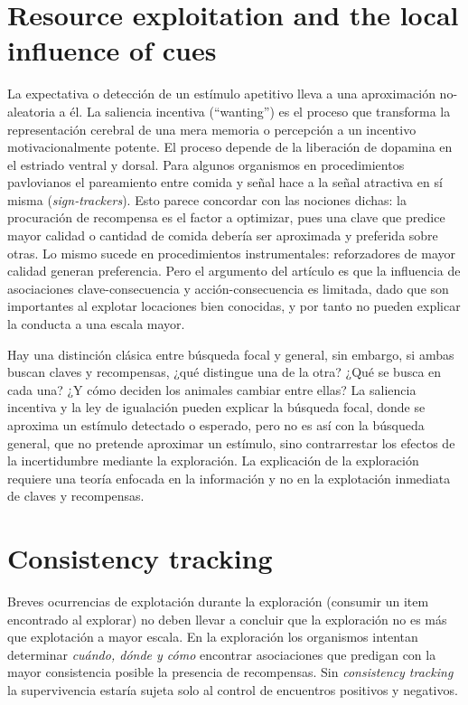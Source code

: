 \documentclass[a4paper,12pt]{article}
\begin{document}
\section{Resource exploitation and the local influence of cues}

La expectativa o detección de un estímulo apetitivo lleva a una aproximación no-aleatoria a él.
La saliencia incentiva (``wanting'') es el proceso que transforma la representación cerebral de una mera memoria o percepción a un incentivo motivacionalmente potente.
El proceso depende de la liberación de dopamina en el estriado ventral y dorsal.
Para algunos organismos en procedimientos pavlovianos el pareamiento entre comida y señal hace a la señal atractiva en sí misma ({\itshape sign-trackers}).
Esto parece concordar con las nociones dichas: la procuración de recompensa es el factor a optimizar, pues una clave que predice mayor calidad o cantidad de comida debería ser aproximada y preferida sobre otras.
Lo mismo sucede en procedimientos instrumentales: reforzadores de mayor calidad generan preferencia.
Pero el argumento del artículo es que la influencia de asociaciones clave-consecuencia y acción-consecuencia es limitada, dado que son importantes al explotar locaciones bien conocidas, y por tanto no pueden explicar la conducta a una escala mayor.

Hay una distinción clásica entre búsqueda focal y general, sin embargo, si ambas buscan claves y recompensas, ¿qué distingue una de la otra? ¿Qué se busca en cada una? ¿Y cómo deciden los animales cambiar entre ellas? La saliencia incentiva y la ley de igualación pueden explicar la búsqueda focal, donde se aproxima un estímulo detectado o esperado, pero no es así con la búsqueda general, que no pretende aproximar un estímulo, sino contrarrestar los efectos de la incertidumbre mediante la exploración.
La explicación de la exploración requiere una teoría enfocada en la información y no en la explotación inmediata de claves y recompensas.

\section{Consistency tracking}

Breves ocurrencias de explotación durante la exploración (consumir un item encontrado al explorar) no deben llevar a concluir que la exploración no es más que explotación a mayor escala.
En la exploración los organismos intentan determinar {\itshape cuándo, dónde y cómo} encontrar asociaciones que predigan con la mayor consistencia posible la presencia de recompensas.
Sin {\itshape consistency tracking} la supervivencia estaría sujeta solo al control de encuentros positivos y negativos.
\end{document}
